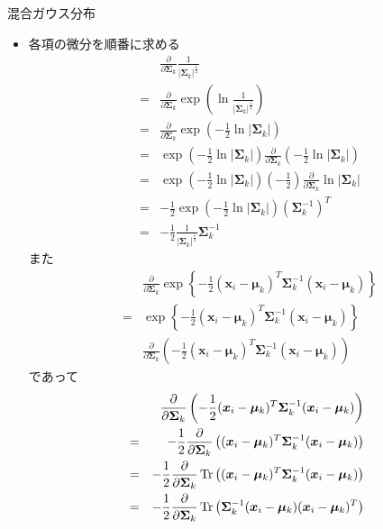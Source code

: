 \documentclass[dvipdfmx,notheorems,t]{beamer}
\begin{document}
\begin{frame}{混合ガウス分布}
\begin{itemize}
\begin{itemize}
		\item 各項の微分を順番に求める
		\begin{eqnarray}
			&& \frac{\partial}{\partial \bm{\Sigma}_k} \frac{1}{|\bm{\Sigma}_k|^\frac{1}{2}} \nonumber \\
			&=& \frac{\partial}{\partial \bm{\Sigma}_k} \exp \left( \ln \frac{1}{|\bm{\Sigma}_k|^\frac{1}{2}} \right) \nonumber \\
			&=& \frac{\partial}{\partial \bm{\Sigma}_k} \exp \left( - \frac{1}{2} \ln |\bm{\Sigma}_k| \right) \nonumber \\
			&=& \exp \left( - \frac{1}{2} \ln |\bm{\Sigma}_k| \right) \frac{\partial}{\partial \bm{\Sigma}_k} \left( - \frac{1}{2} \ln |\bm{\Sigma}_k| \right) \nonumber \\
			&=& \exp \left( - \frac{1}{2} \ln |\bm{\Sigma}_k| \right) \left( - \frac{1}{2} \right) \frac{\partial}{\partial \bm{\Sigma}_k} \ln |\bm{\Sigma}_k| \nonumber \\
			&=& - \frac{1}{2} \exp \left( - \frac{1}{2} \ln |\bm{\Sigma}_k| \right) \left( \bm{\Sigma}_k^{-1} \right)^T \nonumber \\
			&=& - \frac{1}{2} \frac{1}{|\bm{\Sigma}_k|^\frac{1}{2}} \bm{\Sigma}_k^{-1}
		\end{eqnarray}
		また
		\begin{eqnarray}
			&& \frac{\partial}{\partial \bm{\Sigma}_k} \exp \left\{ - \frac{1}{2} (\bm{x}_i - \bm{\mu}_k)^T \bm{\Sigma}_k^{-1} (\bm{x}_i - \bm{\mu}_k) \right\} \nonumber \\
			&=& \exp \left\{ - \frac{1}{2} (\bm{x}_i - \bm{\mu}_k)^T \bm{\Sigma}_k^{-1} (\bm{x}_i - \bm{\mu}_k) \right\} \nonumber \\
			&& \frac{\partial}{\partial \bm{\Sigma}_k} \left( - \frac{1}{2} (\bm{x}_i - \bm{\mu}_k)^T \bm{\Sigma}_k^{-1} (\bm{x}_i - \bm{\mu}_k) \right)
		\end{eqnarray}
		であって
		\begin{eqnarray}
			&& \frac{\partial}{\partial \bm{\Sigma}_k} \left( - \frac{1}{2} (\bm{x}_i - \bm{\mu}_k)^T \bm{\Sigma}_k^{-1} (\bm{x}_i - \bm{\mu}_k) \right) \nonumber \\
			&=& - \frac{1}{2} \frac{\partial}{\partial \bm{\Sigma}_k} \left( (\bm{x}_i - \bm{\mu}_k)^T \bm{\Sigma}_k^{-1} (\bm{x}_i - \bm{\mu}_k) \right) \nonumber \\
			&=& - \frac{1}{2} \frac{\partial}{\partial \bm{\Sigma}_k} \Tr \left( (\bm{x}_i - \bm{\mu}_k)^T \bm{\Sigma}_k^{-1} (\bm{x}_i - \bm{\mu}_k) \right) \nonumber \\
			&=& - \frac{1}{2} \frac{\partial}{\partial \bm{\Sigma}_k} \Tr \left( \bm{\Sigma}_k^{-1} (\bm{x}_i - \bm{\mu}_k) (\bm{x}_i - \bm{\mu}_k)^T \right) \nonumber \\

\end{eqnarray}
\end{itemize}
\end{itemize}
\end{frame}
\end{document}
